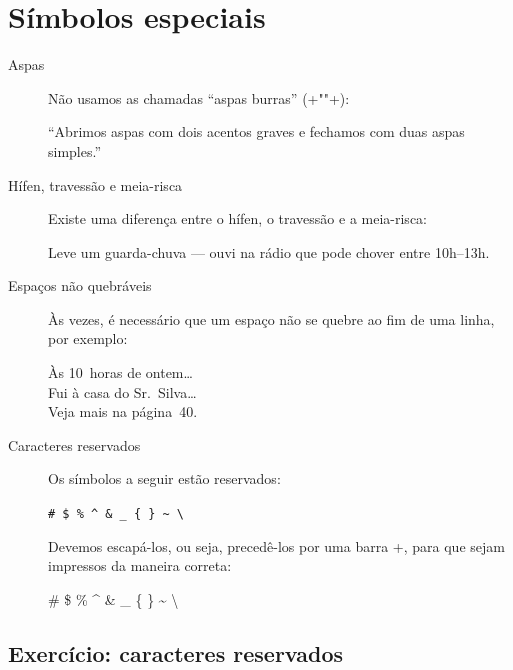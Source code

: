 \documentclass[10pt,a4paper,oneside]{article}
\newenvironment{example}
{\begin{center}\begin{examplebox}}
{\end{examplebox}\end{center}}
\begin{document}
\section{Símbolos especiais}

\begin{description}
  \item[Aspas] Não usamos as chamadas “aspas burras” (\code+""+):

  \begin{example}
    ``Abrimos aspas com dois acentos graves e fechamos com duas aspas simples.''
  \end{example}

  \item[Hífen, travessão e meia-risca] Existe uma diferença entre o hífen, o travessão e a meia-risca:

  \begin{example}
    Leve um guarda-chuva --- ouvi na rádio que pode chover entre 10h--13h.
  \end{example}

  \item[Espaços não quebráveis] Às vezes, é necessário que um espaço não se quebre ao fim de uma linha, por exemplo:

  \begin{example}
    Às 10~horas de ontem…\\
    Fui à casa do Sr.~Silva…\\
    Veja mais na página~40.
  \end{example}

  \item[Caracteres reservados] Os símbolos a seguir estão reservados:

  \begin{example}
    \verb+# $ % ^ & _ { } ~ \+
  \end{example}

  Devemos escapá-los, ou seja, precedê-los por uma barra \code+\+, para que sejam impressos da maneira correta:

  \begin{example}
    \# \$ \% \^{} \& \_ \{ \} \~{} \textbackslash
  \end{example}
\end{description}

\subsection{Exercício: caracteres reservados}
\end{document}
